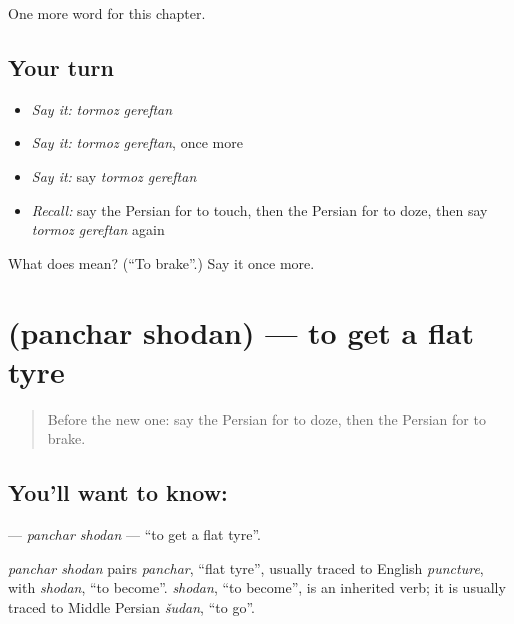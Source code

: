 \begin{grammarlens}[title={What you've built}]
One more word for this chapter.
\end{grammarlens}

\subsection*{Your turn}
\begin{itemize}
\raggedright
  \item \emph{Say it:} \emph{tormoz gereftan}
  \item \emph{Say it:} \emph{tormoz gereftan}, once more
  \item \emph{Say it:} say \emph{tormoz gereftan}
  \item \emph{Recall:} say the Persian for to touch, then the Persian for to doze, then say \emph{tormoz gereftan} again
\end{itemize}

\begin{tcolorbox}[breakable,colback=teal!4,colframe=teal!35!black,title={Before you move on}]
What does   mean? (\textquotedblleft{}To brake\textquotedblright{}.) Say it once more.
\end{tcolorbox}
\section[\texorpdfstring{\fa{پنچر} \fa{شدن} (panchar shodan)}{پنچر شدن (panchar shodan)}]{  (panchar shodan) — to get a flat tyre}

\label{lesson:FA-C148-panchar-shodan}



\begin{quote}
Before the new one: say the Persian for to doze, then the Persian for to brake.
\end{quote}

\subsection*{You'll want to know:  }
\textbf{ } — \emph{panchar shodan} — \textquotedblleft{}to get a flat tyre\textquotedblright{}.

\begin{cousinweb}
\emph{panchar shodan} pairs \emph{panchar}, \textquotedblleft{}flat tyre\textquotedblright{}, usually traced to English \emph{puncture}, with \emph{shodan}, \textquotedblleft{}to become\textquotedblright{}. \emph{shodan}, \textquotedblleft{}to become\textquotedblright{}, is an inherited verb; it is usually traced to Middle Persian \emph{šudan}, \textquotedblleft{}to go\textquotedblright{}.
\end{cousinweb}

